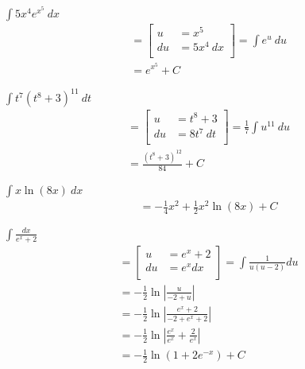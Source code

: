 \documentclass[12pt]{article}
\newenvironment{problem}[2][]{
    \begin{trivlist}
        \item[
            {\bfseries #1}
            {\bfseries #2.}
        ]
}{\end{trivlist}}
\newcommand{\subu}[2]{
\left[
\begin{alignedat}{1}
u &= #1 \\
du &= #2 \\
\end{alignedat}
\right] 
}
\begin{document}
\begin{problem}{47}
$\displaystyle\int 5x^4 e^{x^5} ~ dx$
\begin{align}
&= \subu{x^5}{5x^4 ~ dx} = \int e^u ~ du \\
&= e^{x^5} + C
\end{align}
\end{problem}

\begin{problem}{49}
$\displaystyle\int t^7 \left(t^8 + 3\right)^{11} ~ dt$
\begin{align}
&= \subu{t^8 + 3}{8t^7 ~ dt} = \frac{1}{7} \int u^{11} ~ du \\
&= \frac{\left(t^8 + 3\right)^{12}}{84} + C
\end{align}
\end{problem}

\begin{problem}{51}
$\displaystyle\int x \ln \left(8x\right) ~ dx$
\begin{align}
&= - \frac{1}{4} x^2 + \frac{1}{2} x^2 \ln \left(8x\right) + C
\end{align}
\end{problem}

\begin{problem}{53}
$\displaystyle\int \frac{dx}{e^x + 2}$
\begin{align}
&= \subu{e^x + 2}{e^x dx} = \int \frac{1}{u \left(u - 2\right)} du \\
&= - \frac{1}{2} \ln \left|\frac{u}{-2 + u}\right| \\
&= - \frac{1}{2} \ln \left|\frac{e^x + 2}{-2 + e^x + 2}\right| \\
&= - \frac{1}{2} \ln \left|\frac{e^x}{e^x} + \frac{2}{e^x}\right| \\
&= - \frac{1}{2} \ln \left(1 + 2e^{-x}\right) + C
\end{align}
\end{problem}
\end{document}
